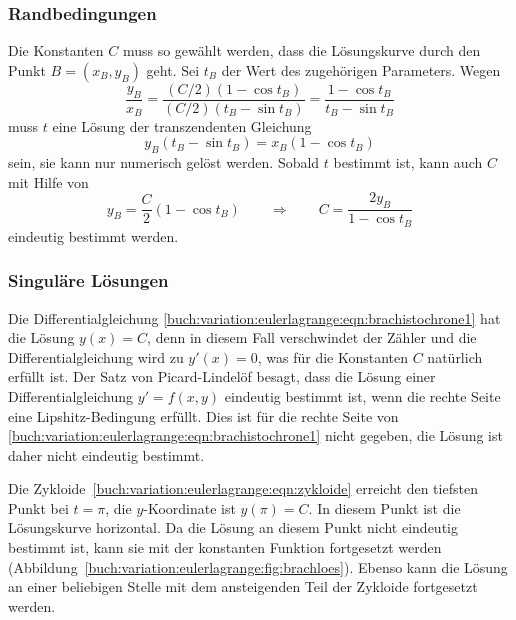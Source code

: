 %
%
\subsubsection{Randbedingungen}
Die Konstanten $C$ muss so gewählt werden, dass die Lösungskurve
durch den Punkt $B=(x_B,y_B)$ geht. 
Sei $t_B$ der Wert des zugehörigen Parameters.
Wegen
\[
\frac{y_B}{x_B}
=
\frac{(C/2)(1-\cos t_B)}{(C/2)(t_B-\sin t_B)}
=
\frac{1-\cos t_B}{t_B-\sin t_B}
\]
muss $t$ eine Lösung der transzendenten Gleichung
\[
y_B(t_B-\sin t_B)=x_B(1-\cos t_B)
\]
sein, sie kann nur numerisch gelöst werden.
Sobald $t$ bestimmt ist, kann auch $C$ mit Hilfe von
\[
y_B = \frac{C}2(1-\cos t_B)
\qquad\Rightarrow\qquad
C
=
\frac{2y_B}{1-\cos t_B}
\]
eindeutig bestimmt werden.

%
%
\subsubsection{Singuläre Lösungen}

Die Differentialgleichung
\eqref{buch:variation:eulerlagrange:eqn:brachistochrone1}
hat die Lösung $y(x)=C$, denn in diesem Fall verschwindet
der Zähler und die Differentialgleichung wird zu $y'(x)=0$,
was für die Konstanten $C$ natürlich erfüllt ist.
Der Satz von Picard-Lindelöf besagt, dass die Lösung einer
Differentialgleichung $y'=f(x,y)$ eindeutig bestimmt ist, wenn die rechte
Seite eine Lipshitz-Bedingung erfüllt.
Dies ist für die rechte Seite von
\eqref{buch:variation:eulerlagrange:eqn:brachistochrone1}
nicht gegeben, die Lösung ist daher nicht eindeutig bestimmt.

Die Zykloide~\eqref{buch:variation:eulerlagrange:eqn:zykloide}
erreicht den tiefsten Punkt bei $t=\pi$, die $y$-Koordinate ist
$y(\pi)=C$.
In diesem Punkt ist die Lösungskurve horizontal.
Da die Lösung an diesem Punkt nicht eindeutig bestimmt ist,
kann sie mit der konstanten Funktion fortgesetzt werden
(Abbildung~\ref{buch:variation:eulerlagrange:fig:brachloes}).
Ebenso kann die Lösung an einer beliebigen Stelle mit dem ansteigenden
Teil der Zykloide fortgesetzt werden.




